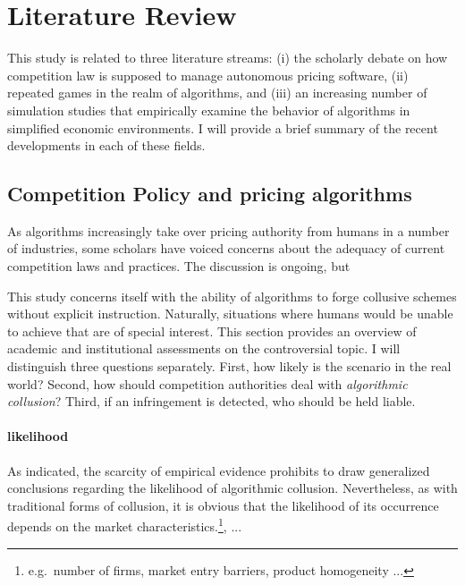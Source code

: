 \section{Literature Review}\label{literature review}



This study is related to three literature streams: (i) the scholarly debate on how competition law is supposed to manage autonomous pricing software, (ii)  repeated games in the realm of algorithms, and (iii) an increasing number of simulation studies that empirically examine the behavior of algorithms in simplified economic environments. I will provide a brief summary of the recent developments in each of these fields.

\subsection{Competition Policy and pricing algorithms}

As algorithms increasingly take over pricing authority from humans in a number of industries, some scholars have voiced concerns about the adequacy of current competition laws and practices. The discussion is ongoing, but 



This study concerns itself with the ability of algorithms to forge collusive schemes without explicit instruction. Naturally, situations where humans would be unable to achieve that are of special interest. This section provides an overview of academic and institutional assessments on the controversial topic. I will distinguish three questions separately. First, how likely is the scenario in the real world? Second, how should competition authorities deal with \emph{algorithmic collusion}? Third, if an infringement is detected, who should be held liable.

\paragraph{likelihood}

As indicated, the scarcity of empirical evidence prohibits to draw generalized conclusions regarding the likelihood of algorithmic collusion. Nevertheless, as with traditional forms of collusion, it is obvious that the likelihood of its occurrence depends on the market characteristics.\footnote{e.g.\ number of firms, market entry barriers, product homogeneity ...}, 
 ...



